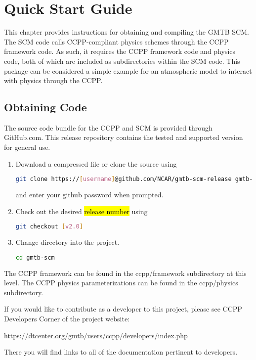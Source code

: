 \chapter{Quick Start Guide}
\label{chapter: quick}

This chapter provides instructions for obtaining and compiling  the GMTB SCM. The SCM code calls CCPP-compliant physics schemes through the CCPP framework code. As such, it requires the CCPP framework code and physics code, both of which are included as subdirectories within the SCM code. This package can be considered a simple example for an atmospheric model to interact with physics through the CCPP.

\section{Obtaining Code}

The source code bundle for the CCPP and SCM is provided through GitHub.com.  This release repository contains the tested and supported version for general use.

\begin{enumerate}
    \item Download a compressed file or clone the source using
\begin{lstlisting}[language=bash]
git clone https://[username]@github.com/NCAR/gmtb-scm-release gmtb-scm
\end{lstlisting}
    and enter your github password when prompted.
    \item Check out the desired \hl{release number} using
\begin{lstlisting}[language=bash]
git checkout [v2.0]
\end{lstlisting}
    \item Change directory into the project.
\begin{lstlisting}[language=bash]
cd gmtb-scm
\end{lstlisting}
\end{enumerate}

The CCPP framework can be found in the ccpp/framework subdirectory at this level.  The CCPP physics parameterizations can be found in the ccpp/physics subdirectory.

If you would like to contribute as a developer to this project, please see CCPP Developers Corner of the project website:

\url{https://dtcenter.org/gmtb/users/ccpp/developers/index.php}

There you will find links to all of the documentation pertinent to developers.

